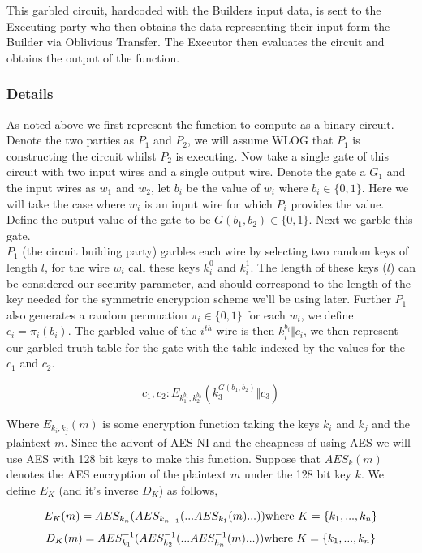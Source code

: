 \documentclass[a4paper,10pt]{article}
\begin{document}
				This garbled circuit, hardcoded with the Builders input data, is sent to the Executing party who then obtains the data representing their input form the Builder via Oblivious Transfer. The Executor then evaluates the circuit and obtains the output of the function.


			\subsubsection{Details} \label{Yao_Details}
				As noted above we first represent the function to compute as a binary circuit. Denote the two parties as $P_1$ and $P_2$, we will assume WLOG that $P_1$ is constructing the circuit whilst $P_2$ is executing. Now take a single gate of this circuit with two input wires and a single output wire. Denote the gate a $G_1$ and the input wires as $w_1$ and $w_2$, let $b_i$ be the value of $w_i$ where $b_i \in \{0, 1\}$. Here we will take the case where $w_i$ is an input wire for which $P_i$ provides the value. Define the output value of the gate to be $G(b_1, b_2) \in \{0, 1\}$. Next we garble this gate.\\

				$P_1$ (the circuit building party) garbles each wire by selecting two random keys of length $l$, for the wire $w_i$ call these keys $k_i^0$ and $k_i^1$. The length of these keys ($l$) can be considered our security parameter, and should correspond to the length of the key needed for the symmetric encryption scheme we'll be using later. Further $P_1$ also generates a random permuation $\pi_i \in \{0, 1\}$ for each $w_i$, we define $c_i = \pi_i(b_i)$. The garbled value of the $i^{th}$ wire is then $k_i^{b_i} \Vert c_i$, we then represent our garbled truth table for the gate with the table indexed by the values for the $c_1$ and $c_2$.

				$$ c_1, c_2 : E_{k_1^{b_1}, k_2^{b_2}} (k_3^{ G(b_1, b_2) } \Vert c_3) $$

				Where $E_{k_i, k_j}(m)$ is some encryption function taking the keys $k_i$ and $k_j$ and the plaintext $m$. Since the advent of AES-NI and the cheapness of using AES we will use AES with 128 bit keys to make this function. Suppose that $AES_k(m)$ denotes the AES encryption of the plaintext $m$ under the 128 bit key $k$. We define $E_K$ (and it's inverse $D_K$)  as follows,

				$$ E_K(m) = AES_{k_n}( AES_{k_{n-1}}( ...AES_{k_1}(m) ...) ) \textnormal{where } K = \{k_1, ..., k_n\}$$ 
				$$ D_K(m) = AES^{-1}_{k_1}( AES^{-1}_{k_{2}}( ...AES^{-1}_{k_n}(m) ...) ) \textnormal{where } K = \{k_1, ..., k_n\}$$ 
\end{document}
